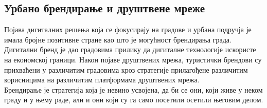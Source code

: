 \documentclass{article}
\begin{document}
\begin{multicols}{3}
\section*{Урбано брендирање и друштвене мреже}
\noindent Појава дигиталних решења која се фокусирају на градове и урбана подручја је имала бројне позитивне стране као што је могућност брендирања града. Дигитални бренд је дао градовима прилику да дигиталне технологије искористе на економској граници. Након појаве друштвених мрежа, туристички брендови су прихваћени у различитим градовима кроз стратегије прилагођене различитим корисницима на различитим платформама друштвених мрежа. \\
Брендирање је стратегија која је невино усвојена, да би се они, који живе у неком граду и у њему раде, али и они који су га само посетили осетили његовим делом. 


\end{multicols}
\end{document}
